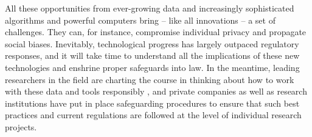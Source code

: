 All these opportunities from ever-growing data and increasingly sophisticated
algorithms and powerful computers bring -- like all innovations -- a set of
challenges. They can, for instance, compromise individual privacy and propagate
social biases. Inevitably, technological progress has largely outpaced
regulatory responses, and it will take time to understand all the implications
of these new technologies and enshrine proper safeguards into law. In the
meantime, leading researchers in the field are charting the course in thinking
about how to work with these data and tools responsibly
\citep{demontjoye2015unique, kosinski2015facebook, blumenstock2018don}, and
private companies as well as research institutions have put in place
safeguarding procedures to ensure that such best practices and current
regulations are followed at the level of individual research projects.


